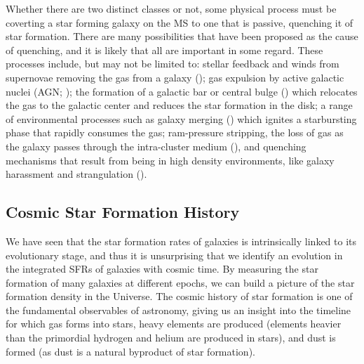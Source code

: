 Whether there are two distinct classes or not, some physical process must be coverting a star forming galaxy on the MS to one that is passive, quenching it of star formation. There are many possibilities that have been proposed as the cause of quenching, and it is likely that all are important in some regard. These processes include, but may not be limited to: stellar feedback and winds from supernovae removing the gas from a galaxy (\citealt{Hayward_2017}); gas expulsion by active galactic nuclei (AGN; \citealt{Springel_2005, Croton_2006, Cicone_2014, Harrison_2017}); the formation of a galactic bar or central bulge (\citealt{Bournaud_2007, Martig_2009}) which relocates the gas to the galactic center and reduces the star formation in the disk; a range of environmental processes such as galaxy merging (\citealt{Lavery_1994, Weigel_2017}) which ignites a starbursting phase that rapidly consumes the gas; ram-pressure stripping, the loss of gas as the galaxy passes through the intra-cluster medium (\citealt{Gunn_1972, Boselli_2006, Domainko_2006, Boselli_2014}), and quenching mechanisms that result from being in high density environments, like galaxy harassment and strangulation (\citealt{Moore_1996, Moore_1998, Bekki_2002}).

\subsection{Cosmic Star Formation History}
\label{sec:cosmic_star_formation_history}

We have seen that the star formation rates of galaxies is intrinsically linked to its evolutionary stage, and thus it is unsurprising that we identify an evolution in the integrated SFRs of galaxies with cosmic time. By measuring the star formation of many galaxies at different epochs, we can build a picture of the star formation density in the Universe. The cosmic history of star formation is one of the fundamental observables of astronomy, giving us an insight into the timeline for which gas forms into stars, heavy elements are produced (elements heavier than the primordial hydrogen and helium are produced in stars), and dust is formed (as dust is a natural byproduct of star formation).

